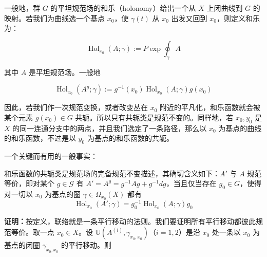 一般地，群 $G$ 的平坦规范场的和乐（holonomy）给出一个从 $X$ 上闭曲线到 $G$ 的映射。若我们为曲线选一个基点 $x_0$，使 $\gamma(t)$ 从 $x_0$ 出发又回到 $x_0$，则定义和乐为：

\begin{equation}
  \operatorname{Hol}_{x_0}(A;\gamma):=P\exp\oint_{\gamma}A
  \tag{2.94}
  \label{eq:2.94}
\end{equation}

其中 $A$ 是平坦规范场。一般地

\begin{equation}
  \operatorname{Hol}_{x_0}(A^{g};\gamma):=g^{-1}(x_0)\operatorname{Hol}_{x_0}(A;\gamma)g(x_0)
  \tag{2.95}
  \label{eq:2.95}
\end{equation}

因此，若我们作一次规范变换，或者改变丛在 $x_0$ 附近的平凡化，和乐函数就会被某个元素 $g(x_0)\in G$ 共轭。所以只有共轭类是规范不变的。同样地，若 $x_0,y_0$ 是 $X$ 的同一连通分支中的两点，并且我们选定了一条路径，那么以 $x_0$ 为基点的曲线的和乐函数，不过是以 $y_0$ 为基点的和乐函数的共轭。

一个关键而有用的一般事实：


\begin{theorem}
  和乐函数的共轭类是规范场的完备规范不变描述，其确切含义如下：$A'$ 与 $A$ 规范等价，即对某个 $g\in\mathcal{G}$ 有 $A'=A^{g}=g^{-1}Ag+g^{-1}dg$，当且仅当存在 $g_0\in G$，使得对一切以 $x_0$ 为基点的圈 $\gamma\in\Omega_{x_0}(X)$ 都有
  \begin{equation}
    \operatorname{Hol}_{x_0}(A';\gamma)=g_0^{-1}\operatorname{Hol}_{x_0}(A;\gamma)g_0
    \tag{2.96}
    \label{eq:2.96}
  \end{equation}
\end{theorem}

\textbf{证明：}按定义，联络就是一条平行移动的法则。我们要证明所有平行移动都彼此规范等价。取一点 $x_0\in X$。设 $\mathbb{U}(A^{(i)},\gamma_{x_0,x_0})$（$i=1,2$）是沿 $x_0$ 处一条以 $x_0$ 为基点的闭圈 $\gamma_{x_0,x_0}$ 的平行移动。则

